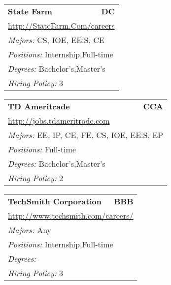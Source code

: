 \documentclass[twoside]{article}
\begin{document}
\begin{center}
\begin{multicols}{3}
\begin{FlushLeft}
\begin{minipage}{.9\columnwidth}
\end{minipage}
 
\begin{minipage}{.9\columnwidth}\begin{tabularx}{.95\columnwidth}{Xr}
                 {\Large\bf State Farm} & {\Large\bf DC}\\
    \multicolumn{2}{p{.95\columnwidth}}{\url{http://StateFarm.Com/careers}}\\
    \multicolumn{2}{p{.95\columnwidth}}{\emph{Majors:} CS, IOE, EE:S, CE}\\
    \multicolumn{2}{p{.95\columnwidth}}{\emph{Positions:} Internship,Full-time}\\
    \multicolumn{2}{p{.95\columnwidth}}{\emph{Degrees:} Bachelor's,Master's}\\
    \multicolumn{2}{p{.95\columnwidth}}{\emph{Hiring Policy:} 3}\\
    \end{tabularx}
    
\end{minipage}
 
\begin{minipage}{.9\columnwidth}\begin{tabularx}{.95\columnwidth}{Xr}
                 {\Large\bf TD Ameritrade} & {\Large\bf CCA}\\
    \multicolumn{2}{p{.95\columnwidth}}{\url{http://jobs.tdameritrade.com}}\\
    \multicolumn{2}{p{.95\columnwidth}}{\emph{Majors:} EE, IP, CE, FE, CS, IOE, EE:S, EP}\\
    \multicolumn{2}{p{.95\columnwidth}}{\emph{Positions:} Full-time}\\
    \multicolumn{2}{p{.95\columnwidth}}{\emph{Degrees:} Bachelor's,Master's}\\
    \multicolumn{2}{p{.95\columnwidth}}{\emph{Hiring Policy:} 2}\\
    \end{tabularx}
    
\end{minipage}
 
\begin{minipage}{.9\columnwidth}\begin{tabularx}{.95\columnwidth}{Xr}
                 {\Large\bf TechSmith Corporation} & {\Large\bf BBB}\\
    \multicolumn{2}{p{.95\columnwidth}}{\url{http://www.techsmith.com/careers/}}\\
    \multicolumn{2}{p{.95\columnwidth}}{\emph{Majors:} Any}\\
    \multicolumn{2}{p{.95\columnwidth}}{\emph{Positions:} Internship,Full-time}\\
    \multicolumn{2}{p{.95\columnwidth}}{\emph{Degrees:} }\\
    \multicolumn{2}{p{.95\columnwidth}}{\emph{Hiring Policy:} 3}\\
    \end{tabularx}
    

\end{minipage}
\end{FlushLeft}
\end{multicols}
\end{center}
\end{document}
